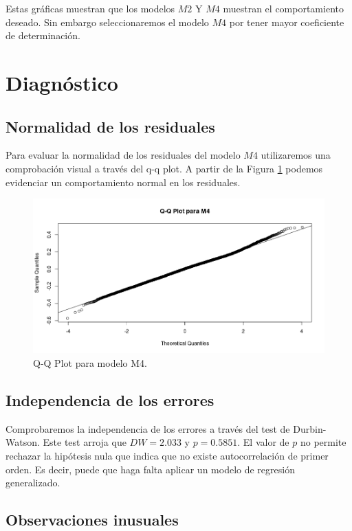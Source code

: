 \documentclass[10pt,letterpaper]{article}
\begin{document}
Estas gráficas muestran que los modelos $M2$ Y $M4$ muestran el comportamiento deseado. Sin embargo seleccionaremos el modelo $M4$ por tener mayor coeficiente de determinación.

\section{Diagnóstico}

\subsection{Normalidad de los residuales}
Para evaluar la normalidad de los residuales del modelo $M4$ utilizaremos una comprobación visual a través del q-q plot. A partir de la Figura \ref{fig:qqm4} podemos evidenciar un comportamiento normal en los residuales.

\begin{figure}[!htbp]
	\includegraphics[scale=0.5]{qqplot_M4.png}
	\caption{Q-Q Plot para modelo M4.}
	\label{fig:qqm4}
\end{figure}

\subsection{Independencia de los errores}
Comprobaremos la independencia de los errores a través del test de Durbin-Watson. Este test arroja que $DW=2.033$ y $p=0.5851$. El valor de $p$ no permite rechazar la hipótesis nula que indica que no existe autocorrelación de primer orden. Es decir, puede que haga falta aplicar un modelo de regresión generalizado.

\subsection{Observaciones inusuales}
\end{document}
